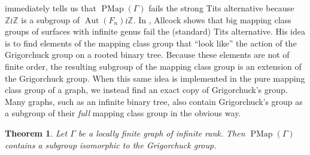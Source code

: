 \documentclass[11pt]{amsart}
\theoremstyle{plain}
\newtheorem{THM}{Theorem}[section]
\theoremstyle{definition}
\DeclareMathOperator{\Aut}{Aut}
\DeclareMathOperator{\PMap}{PMap}
\newcommand{\Z}{\mathbb{Z}}
\def\G{{\Gamma}}
\newcommand{\<}{\langle}
\renewcommand{\>}{\rangle}
\begin{document}
 immediately tells us that $\PMap(\G)$ fails the strong Tits alternative because $\Z \wr \Z$ is a subgroup of $\Aut(F_n) \wr \Z$. In \cite{Allcock2021}, Allcock shows that big mapping class groups of surfaces with infinite genus fail the (standard) Tits alternative.
His idea is to find elements of the mapping class group that ``look like'' the action of the Grigorchuck group on a rooted binary tree. Because these elements are not of finite order, the resulting subgroup of the mapping class group is an extension of the Grigorchuck group. When this same idea is implemented in the pure mapping class group of a graph, we instead find an exact copy of Grigorchuck's group. Many graphs, such as an infinite binary tree, also contain Grigorchuck's group as a subgroup of their \emph{full} mapping class group in the obvious way.

\begin{THM} \label{thm:Grigorchuck}
     Let $\G$ be a locally finite graph of infinite rank. Then $\PMap(\G)$ contains a subgroup isomorphic to the Grigorchuck group.
\end{THM}
\end{document}

